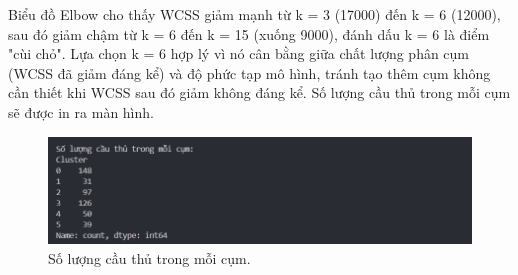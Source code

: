 \documentclass[12pt, a4paper]{report}
\begin{document}
Biểu đồ Elbow cho thấy WCSS giảm mạnh từ k = 3 (17000) đến k = 6 (12000), sau đó giảm chậm từ k = 6 đến k = 15 (xuống 9000), đánh dấu k = 6 là điểm "cùi chỏ".
Lựa chọn k = 6 hợp lý vì nó cân bằng giữa chất lượng phân cụm (WCSS đã giảm đáng kể) và độ phức tạp mô hình, tránh tạo thêm cụm không cần thiết khi WCSS sau đó giảm không đáng kể.
Số lượng cầu thủ trong mỗi cụm sẽ được in ra màn hình.

\begin{figure}[H]
    \centering
    \includegraphics[width=\textwidth]{cluster.png}
    \caption{Số lượng cầu thủ trong mỗi cụm.}
    \label{fig:players_per_cluster}
\end{figure}
\end{document}

